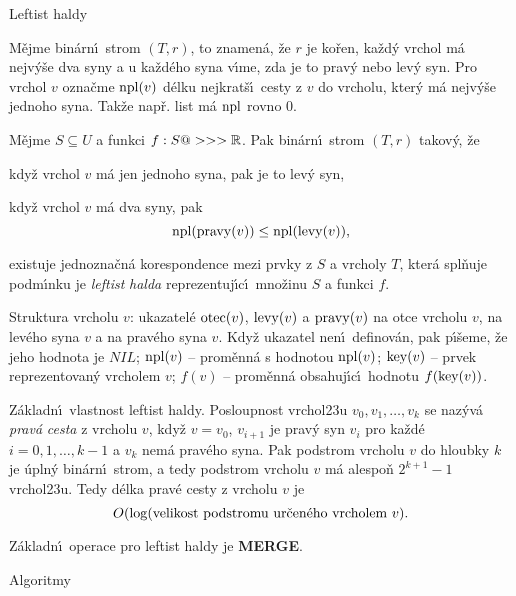 \heading
Leftist haldy
\endheading

\flushpar M\v ejme bin\'arn\'\i\ strom $(T,r)$, to znamen\'a, \v ze $
r$ je ko\v ren, 
ka\v zd\'y vrchol m\'a nejv\'y\v se dva syny a u ka\v zd\'eho syna 
v\'\i me, zda je to prav\'y nebo lev\'y syn. Pro vrchol $v$ 
ozna\v cme $\operatorname{npl}(v)$ d\'elku nejkrat\v s\'\i\ cesty z $v$ do vrcholu, kter\'y m\'a 
nejv\'y\v se jednoho syna. Tak\v ze nap\v r. list m\'a $\operatorname{npl}$ rovno $
0$.
\medskip

\flushpar M\v ejme $S\subseteq U$ a funkci $f:S@>>>\Bbb R$. Pak bin\'arn\'\i\ strom 
$(T,r)$ takov\'y, \v ze
\roster
\item
kdy\v z vrchol $v$ m\'a jen jednoho syna, pak je to lev\'y syn,
\item
kdy\v z vrchol $v$ m\'a dva syny, pak 
$$\operatorname{npl}(\operatorname{pravy}(v))\le\operatorname{npl}(\operatorname{levy}(v)),$$
\item
existuje jednozna\v cn\'a korespondence mezi prvky z $S$ a 
vrcholy $T$, kter\'a spl\v nuje podm\'\i nku 
\endroster
je \emph{leftist} \emph{halda} 
reprezentuj\'\i c\'\i\ mno\v zinu $S$ a funkci $f$. 
\medskip

\flushpar Struktura vrcholu $v$:\newline 
ukazatel\'e $\operatorname{otec}(v)$, $\operatorname{levy}(v)$ a $\operatorname{pravy}(v)$ na otce vrcholu $
v$, 
na lev\'eho syna $v$ a na prav\'eho syna $v$. Kdy\v z ukazatel 
nen\'\i\ definov\'an, pak p\'\i\v seme, \v ze jeho hodnota je 
$NIL$;\newline 
$\operatorname{npl}(v)$ -- prom\v enn\'a s hodnotou $\operatorname{npl}(v)$;\newline 
$\operatorname{key}(v)$ -- prvek reprezentovan\'y vrcholem $v$;\newline 
$f(v)$ -- prom\v enn\'a obsahuj\'\i c\'\i\ hodnotu $f(\operatorname{key}(v))$.
\medskip

\flushpar Z\'akladn\'\i\ vlastnost leftist haldy.\newline 
Posloupnost vrchol\accent23u $v_0,v_1,\dots,v_k$ se naz\'yv\'a 
\emph{prav\'a} \emph{cesta} z vrcholu $v$, kdy\v z $v=v_0$, $v_{i
+1}$ 
je prav\'y syn $v_i$ pro ka\v zd\'e $i=0,1,\dots,k-1$ a $v_k$ nem\'a 
prav\'eho syna. Pak podstrom vrcholu $v$ do hloubky $k$ je 
\'upln\'y bin\'arn\'\i\ strom, a tedy podstrom vrcholu $v$ m\'a 
alespo\v n $2^{k+1}-1$ vrchol\accent23u. Tedy d\'elka prav\'e 
cesty z vrcholu $v$ je 
$$O(\log(\text{\rm velikost podstromu ur\v cen\'eho vrcholem }v).$$
\medskip

\flushpar Z\'akladn\'\i\ operace pro leftist haldy je {\bf MERGE}.
\bigskip

\subhead
Algoritmy
\endsubhead
\medskip

